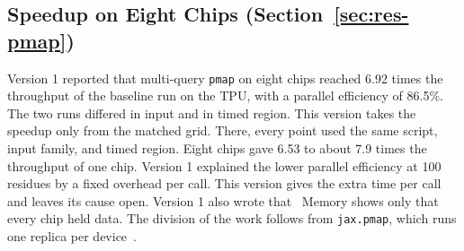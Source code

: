 \subsection*{Speedup on Eight Chips (Section~\ref{sec:res-pmap})}
Version 1 reported that multi-query \texttt{pmap} on eight chips reached 6.92 times the throughput of the baseline run on the TPU, with a parallel efficiency of 86.5\%. %
The two runs differed in input and in timed region. This version takes the speedup only from the matched grid. There,
every point used the same script, input family, and timed region.
Eight chips gave 6.53 to about 7.9 times the throughput of one chip. %
Version 1 explained the lower parallel efficiency at 100 residues by a fixed overhead per call. This version gives the extra time per call and leaves its cause open. %
Version 1 also wrote that \ Memory shows
only that every chip held data. The division of the work follows from \texttt{jax.pmap}, which runs one replica per
device~\cite{jaxpmap}.

